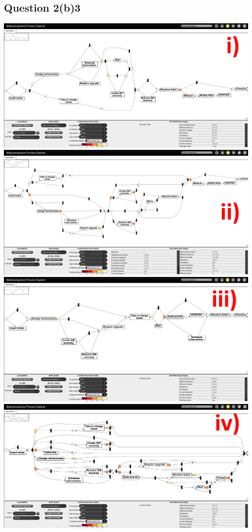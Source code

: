 \documentclass[12pt]{article}
\begin{document}
\subsection*{Question 2(b)3}
\includegraphics[width=\columnwidth]{Question_2/img/ProM_b_inductive_PRE_i.png}\\
\includegraphics[width=\columnwidth]{Question_2/img/ProM_b_inductive_PRE_ii.png}\\
\includegraphics[width=\columnwidth]{Question_2/img/ProM_b_inductive_POST_iii.png}\\
\includegraphics[width=\columnwidth]{Question_2/img/ProM_b_inductive_POST_iv.png}\\
\end{document}
